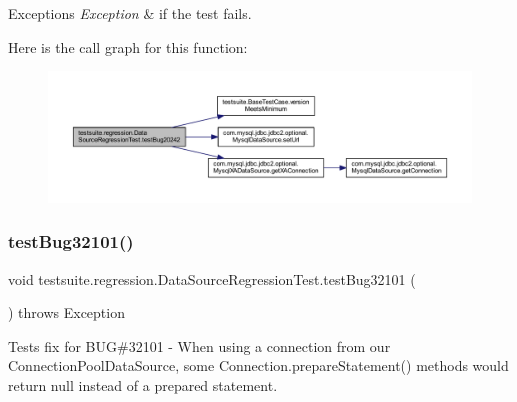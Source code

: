 \begin{DoxyExceptions}{Exceptions}
{\em Exception} & if the test fails. \\
\hline
\end{DoxyExceptions}
Here is the call graph for this function\+:
\nopagebreak
\begin{figure}[H]
\begin{center}
\leavevmode
\includegraphics[width=350pt]{classtestsuite_1_1regression_1_1_data_source_regression_test_a59191cb9aeb387f68d1d484356d9c744_cgraph}
\end{center}
\end{figure}
\mbox{\label{classtestsuite_1_1regression_1_1_data_source_regression_test_afbc8307057c46d97d66b67f78f567cb5}} 
\subsubsection{\texorpdfstring{test\+Bug32101()}{testBug32101()}}
{\footnotesize\ttfamily void testsuite.\+regression.\+Data\+Source\+Regression\+Test.\+test\+Bug32101 (\begin{DoxyParamCaption}{ }\end{DoxyParamCaption}) throws Exception}

Tests fix for B\+UG\#32101 -\/ When using a connection from our Connection\+Pool\+Data\+Source, some Connection.\+prepare\+Statement() methods would return null instead of a prepared statement.


